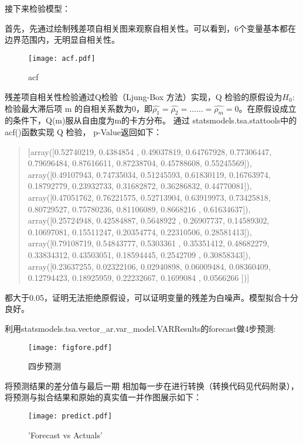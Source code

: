 \documentclass[a4paper,AutoFakeBold,AutoFakeSlant]{ctexart}
\begin{document}
接下来检验模型：

首先，先通过绘制残差项自相关图来观察自相关性。可以看到，6个变量基本都在边界范围内，无明显自相关性。
\begin{figure}[htbp]
  \centering
  \texttt{[image: acf.pdf]}
  \caption{acf}
  \label{f12}
\end{figure}

残差项自相关性检验通过Q检验（Ljung-Box 方法）实现，Q 检验的原假设为$H_0$:检验最大滞后项 m 的自相关系数为0，即$\hat{\rho_1} =\hat{\rho_2} = …… =\hat{\rho_m}=0$。在原假设成立的条件下，Q(m)服从自由度为m的卡方分布。
通过 statsmodels.tsa.stattools中的 acf()函数实现 Q 检验， p-Value返回如下：
\begin{quote}
[array([0.52740219, 0.4384854 , 0.49037819, 0.64767928, 0.77306447,
        0.79696484, 0.87616611, 0.87238704, 0.45788608, 0.55245569]),\\
 array([0.49107943, 0.74735034, 0.51245593, 0.61830119, 0.16763974,
        0.18792779, 0.23932733, 0.31682872, 0.36286832, 0.44770081]),\\
 array([0.47051762, 0.76221575, 0.52713904, 0.63919973, 0.73425818,
        0.80729527, 0.75780236, 0.81106089, 0.8668216 , 0.61634637]),\\
 array([0.25724948, 0.42584887, 0.5648922 , 0.26907737, 0.14589302,
        0.10697081, 0.15511247, 0.20354774, 0.22310506, 0.28581413]),\\
 array([0.79108719, 0.54843777, 0.5303361 , 0.35351412, 0.48682279,
        0.33834312, 0.43503051, 0.18594445, 0.2542709 , 0.30858343]),\\
 array([0.23637255, 0.02322106, 0.02940898, 0.06009484, 0.08360409,
        0.12794423, 0.18925959, 0.22232667, 0.1699084 , 0.0566266 ])]
\end{quote}
都大于0.05，证明无法拒绝原假设，可以证明变量的残差为白噪声。模型拟合十分良好。

利用statsmodels.tsa.vector\_ar.var\_model.VARResults的forecast做4步预测:
\begin{figure}[htbp]
  \centering
  \texttt{[image: figfore.pdf]}
  \caption{四步预测}
  \label{f13}
\end{figure}

将预测结果的差分值与最后一期
相加每一步在进行转换（转换代码见代码附录），将预测与拟合结果和原始的真实值一并作图展示如下：
\begin{figure}[htbp]
  \centering
  \texttt{[image: predict.pdf]}
  \caption{'Forecast vs Actuals'}
  \label{f14}
\end{figure}
\end{document}
